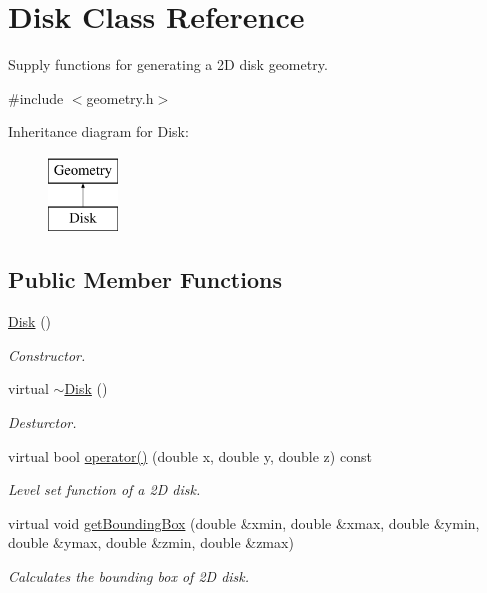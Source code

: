 \hypertarget{classDisk}{\section{Disk Class Reference}
\label{classDisk}
}


Supply functions for generating a 2\-D disk geometry.  




{\ttfamily \#include $<$geometry.\-h$>$}

Inheritance diagram for Disk\-:\begin{figure}[H]
\begin{center}
\leavevmode
\includegraphics[height=2.000000cm]{classDisk}
\end{center}
\end{figure}
\subsection*{Public Member Functions}
\begin{DoxyCompactItemize}
\item 
\hypertarget{classDisk_a7b4e578f63bfbf395e1f6e24a0e43bf4}{\hyperlink{classDisk_a7b4e578f63bfbf395e1f6e24a0e43bf4}{Disk} ()}\label{classDisk_a7b4e578f63bfbf395e1f6e24a0e43bf4}

\begin{DoxyCompactList}\small\item\em Constructor. \end{DoxyCompactList}\item 
\hypertarget{classDisk_a3acdee0c3647086009b5dba33141ccfb}{virtual \hyperlink{classDisk_a3acdee0c3647086009b5dba33141ccfb}{$\sim$\-Disk} ()}\label{classDisk_a3acdee0c3647086009b5dba33141ccfb}

\begin{DoxyCompactList}\small\item\em Desturctor. \end{DoxyCompactList}\item 
virtual bool \hyperlink{classDisk_a3fcfa8ff1210e7f2258dd6db44010b09}{operator()} (double x, double y, double z) const 
\begin{DoxyCompactList}\small\item\em Level set function of a 2\-D disk. \end{DoxyCompactList}\item 
virtual void \hyperlink{classDisk_a903ab97467e580b04073802cf9826369}{get\-Bounding\-Box} (double \&xmin, double \&xmax, double \&ymin, double \&ymax, double \&zmin, double \&zmax)
\begin{DoxyCompactList}\small\item\em Calculates the bounding box of 2\-D disk. \end{DoxyCompactList}\end{DoxyCompactItemize}


